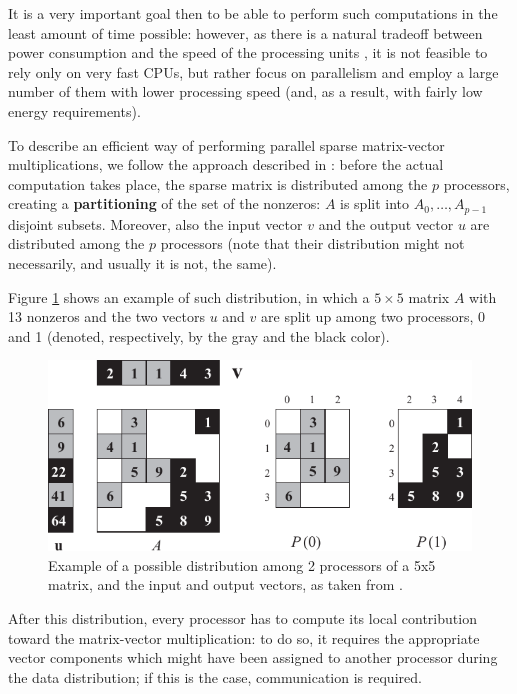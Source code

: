 It is a very important goal then to be able to perform such computations in the least amount of time possible: however, as there is a natural tradeoff between power consumption and the speed of the processing units \cite{rabaey1996digital}, it is not feasible to rely only on very fast CPUs, but rather focus on parallelism and employ a large number of them with lower processing speed (and, as a result, with fairly low energy requirements).

To describe an efficient way of performing parallel sparse matrix-vector multiplications, we follow the approach described in \cite{BSP}: before the actual computation takes place, the sparse matrix is distributed among the $p$ processors, creating a \textbf{partitioning} of the set of the nonzeros: $A$ is split into $A_0,\dots,A_{p-1}$ disjoint subsets. Moreover, also the input vector $v$ and the output vector $u$ are distributed among the $p$ processors (note that their distribution might not necessarily, and usually it is not, the same).

Figure \ref{fig:partition} shows an example of such distribution, in which a $5 \times 5$ matrix $A$ with 13 nonzeros and the two vectors $u$ and $v$ are split up among two processors, 0 and 1 (denoted, respectively, by the gray and the black color).

\begin{figure}[h]
	\centering
	\includegraphics{img/partition}
	\caption{Example of a possible distribution among 2 processors of a 5x5 matrix, and the input and output vectors, as taken from \cite[Fig. 4.3]{BSP}.}
	\label{fig:partition}
\end{figure}

After this distribution, every processor has to compute its local contribution toward the matrix-vector multiplication: to do so, it requires the appropriate vector components which might have been assigned to another processor during the data distribution; if this is the case, communication is required. 

